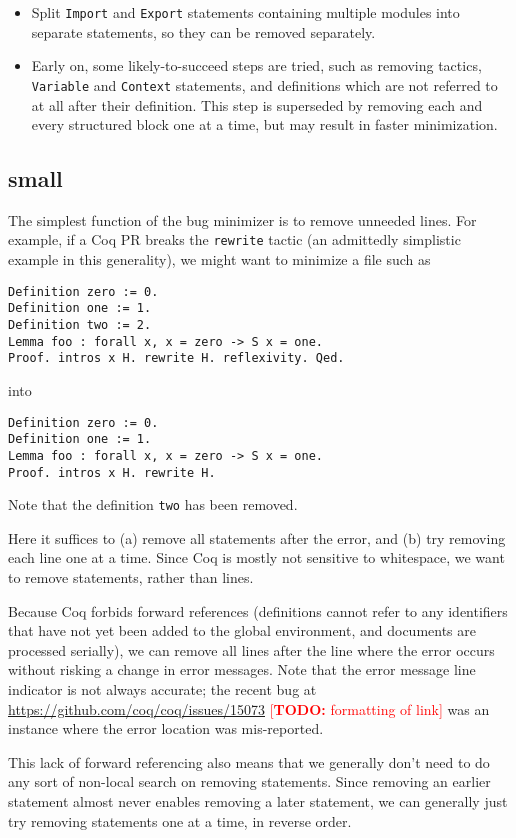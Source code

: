 \documentclass[a4paper,USenglish,cleveref,autoref,thm-restate]{lipics-v2021}
\makeatletter
\newcommand{\todo}[1]{%
\@latex@warning{TODO: \detokenize{#1} on page \thepage}%
\textcolor{red}{[\textbf{TODO:} #1]}}%
\makeatother
\begin{document}
\begin{enumerate}
\begin{enumerate}
\begin{itemize}
  \item Split \verb|Import| and \verb|Export| statements containing multiple modules into separate statements, so they can be removed separately.
  \item Early on, some likely-to-succeed steps are tried, such as removing tactics, \verb|Variable| and \verb|Context| statements, and definitions which are not referred to at all after their definition.
    This step is superseded by removing each and every structured block one at a time, but may result in faster minimization.
  \end{itemize}

\subsection{small}

The simplest function of the bug minimizer is to remove unneeded lines.
For example, if a Coq PR breaks the \texttt{rewrite} tactic (an admittedly simplistic example in this generality), we might want to minimize a file such as
\begin{verbatim}
Definition zero := 0.
Definition one := 1.
Definition two := 2.
Lemma foo : forall x, x = zero -> S x = one.
Proof. intros x H. rewrite H. reflexivity. Qed.
\end{verbatim}
into
\begin{verbatim}
Definition zero := 0.
Definition one := 1.
Lemma foo : forall x, x = zero -> S x = one.
Proof. intros x H. rewrite H.
\end{verbatim}
Note that the definition \texttt{two} has been removed.

Here it suffices to (a) remove all statements after the error, and (b) try removing each line one at a time.
Since Coq is mostly not sensitive to whitespace, we want to remove statements, rather than lines.

Because Coq forbids forward references (definitions cannot refer to any identifiers that have not yet been added to the global environment, and documents are processed serially), we can remove all lines after the line where the error occurs without risking a change in error messages.
Note that the error message line indicator is not always accurate; the recent bug at \url{https://github.com/coq/coq/issues/15073}\todo{formatting of link} was an instance where the error location was mis-reported.

This lack of forward referencing also means that we generally don't need to do any sort of non-local search on removing statements.
Since removing an earlier statement almost never enables removing a later statement, we can generally just try removing statements one at a time, in reverse order.


\end{enumerate}
\end{enumerate}
\end{document}
